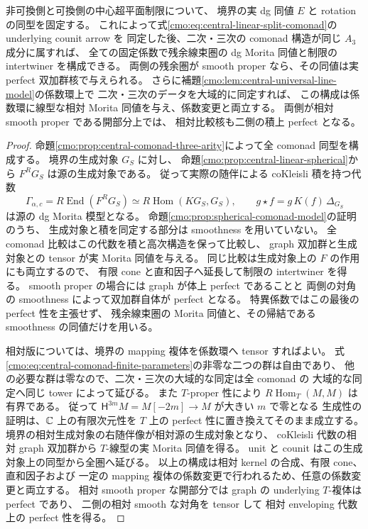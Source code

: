 \begin{corollary}
\label{cmo:cor:central-three-arity-kernel}
非可換側と可換側の中心超平面制限について、
境界の実 dg 同値 $E$ と rotation の同型を固定する。
これによって式\eqref{cmo:eq:central-linear-split-comonad}の underlying counit arrow を
同定した後、二次・三次の comonad 構造が同じ $A_3$ 成分に属すれば、
全ての固定係数で残余線束圏の dg Morita 同値と制限の intertwiner を構成できる。
両側の残余圏が smooth proper なら、その同値は実 perfect 双加群核で与えられる。
さらに補題\ref{cmo:lem:central-universal-line-model}の係数環上で
二次・三次のデータを大域的に同定すれば、
この構成は係数環に線型な相対 Morita 同値を与え、係数変更と両立する。
両側が相対 smooth proper である開部分上では、
相対比較核も二側の積上 perfect となる。
\end{corollary}

\begin{proof}
命題\ref{cmo:prop:central-comonad-three-arity}によって全 comonad 同型を構成する。
境界の生成対象 $G_S$ に対し、
命題\ref{cmo:prop:central-linear-spherical}から $F^RG_S$ は源の生成対象である。
従って実際の随伴による coKleisli 積を持つ代数
\[
 \Gamma_{\alpha,c}
 =R\operatorname{End}(F^RG_S)
 \simeq R\operatorname{Hom}(KG_S,G_S),\qquad
 g\star f=g\,K(f)\,\Delta_{G_S}
\]
は源の dg Morita 模型となる。
命題\ref{cmo:prop:spherical-comonad-model}の証明のうち、
生成対象と積を同定する部分は smoothness を用いていない。
全 comonad 比較はこの代数を積と高次構造を保って比較し、
graph 双加群と生成対象との tensor が実 Morita 同値を与える。
同じ比較は生成対象上の $F$ の作用にも両立するので、
有限 cone と直和因子へ延長して制限の intertwiner を得る。
smooth proper の場合には graph が体上 perfect であることと
両側の対角の smoothness によって双加群自体が perfect となる。
特異係数ではこの最後の perfect 性を主張せず、
残余線束圏の Morita 同値と、その帰結である smoothness の同値だけを用いる。

相対版については、境界の mapping 複体を係数環へ tensor すればよい。
式\eqref{cmo:eq:central-comonad-finite-parameters}の非零な二つの群は自由であり、
他の必要な群は零なので、二次・三次の大域的な同定は全 comonad の
大域的な同定へ同じ tower によって延びる。
また $T$-proper 性により
$R\operatorname{Hom}_T(M,M)$ は有界である。
従って $\mathsf H^{3m}M=M[-2m]\to M$ が大きい $m$ で零となる
生成性の証明は、$\mathbb C$ 上の有限次元性を
$T$ 上の perfect 性に置き換えてそのまま成立する。
境界の相対生成対象の右随伴像が相対源の生成対象となり、
coKleisli 代数の相対 graph 双加群から $T$-線型の実 Morita 同値を得る。
unit と counit はこの生成対象上の同型から全圏へ延びる。
以上の構成は相対 kernel の合成、有限 cone、直和因子および
一定の mapping 複体の係数変更で行われるため、任意の係数変更と両立する。
相対 smooth proper な開部分では graph の underlying $T$-複体は perfect であり、
二側の相対 smooth な対角を tensor して
相対 enveloping 代数上の perfect 性を得る。
\end{proof}
